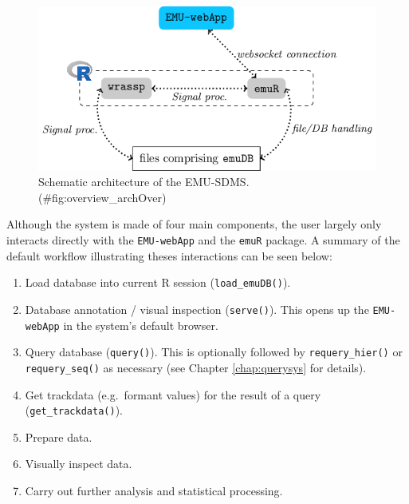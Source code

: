 \documentclass[]{book}
\providecommand{\tightlist}{%
  \setlength{\itemsep}{0pt}\setlength{\parskip}{0pt}}
\theoremstyle{definition}
\theoremstyle{definition}
\theoremstyle{definition}
\theoremstyle{remark}
\begin{document}
\begin{figure}
\centering
\includegraphics{pics/overview.png}
\caption{Schematic architecture of the
EMU-SDMS.(\#fig:overview\_archOver)}
\end{figure}

Although the system is made of four main components, the user largely
only interacts directly with the \texttt{EMU-webApp} and the
\texttt{emuR} package. A summary of the default workflow illustrating
theses interactions can be seen below:

\begin{enumerate}
\def\labelenumi{\arabic{enumi}.}
\tightlist
\item
  Load database into current R session (\texttt{load\_emuDB()}).
\item
  Database annotation / visual inspection (\texttt{serve()}). This opens
  up the \texttt{EMU-webApp} in the system's default browser.
\item
  Query database (\texttt{query()}). This is optionally followed by
  \texttt{requery\_hier()} or \texttt{requery\_seq()} as necessary (see
  Chapter \ref{chap:querysys} for details).
\item
  Get trackdata (e.g.~formant values) for the result of a query
  (\texttt{get\_trackdata()}).
\item
  Prepare data.
\item
  Visually inspect data.
\item
  Carry out further analysis and statistical processing.
\end{enumerate}
\end{document}
